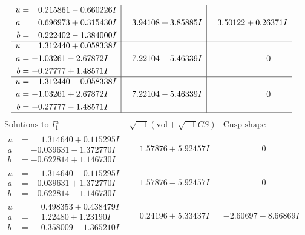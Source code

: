 \documentclass[1p]{elsarticle_modified}
\theoremstyle{definition}
\newcommand{\I}{\sqrt{-1}}
\begin{document}
$$\begin{array}{c|c|c}
\begin{aligned}
u &= \phantom{-}0.215861 - 0.660226 I \\
a &= \phantom{-}0.696973 + 0.315430 I \\
b &= \phantom{-}0.222402 - 1.384000 I\end{aligned}
 & \phantom{-}3.94108 + 3.85885 I & \phantom{-}3.50122 + 0.26371 I \\ \hline\begin{aligned}
u &= \phantom{-}1.312440 + 0.058338 I \\
a &= -1.03261 - 2.67872 I \\
b &= -0.27777 + 1.48571 I\end{aligned}
 & \phantom{-}7.22104 + 5.46339 I & \phantom{-0.000000 } 0 \\ \hline\begin{aligned}
u &= \phantom{-}1.312440 - 0.058338 I \\
a &= -1.03261 + 2.67872 I \\
b &= -0.27777 - 1.48571 I\end{aligned}
 & \phantom{-}7.22104 - 5.46339 I & \phantom{-0.000000 } 0\\
 \hline 
 \end{array}$$\newpage$$\begin{array}{c|c|c}  
\text{Solutions to }I^u_{1}& \I (\text{vol} + \sqrt{-1}CS) & \text{Cusp shape}\\
 \hline 
\begin{aligned}
u &= \phantom{-}1.314640 + 0.115295 I \\
a &= -0.039631 - 1.372770 I \\
b &= -0.622814 + 1.146730 I\end{aligned}
 & \phantom{-}1.57876 + 5.92457 I & \phantom{-0.000000 } 0 \\ \hline\begin{aligned}
u &= \phantom{-}1.314640 - 0.115295 I \\
a &= -0.039631 + 1.372770 I \\
b &= -0.622814 - 1.146730 I\end{aligned}
 & \phantom{-}1.57876 - 5.92457 I & \phantom{-0.000000 } 0 \\ \hline\begin{aligned}
u &= \phantom{-}0.498353 + 0.438479 I \\
a &= \phantom{-}1.22480 + 1.23190 I \\
b &= \phantom{-}0.358009 - 1.365210 I\end{aligned}
 & \phantom{-}0.24196 + 5.33437 I & -2.60697 - 8.66869 I \\ \hline\begin{aligned}

\end{aligned}
\end{array}$$
\end{document}
